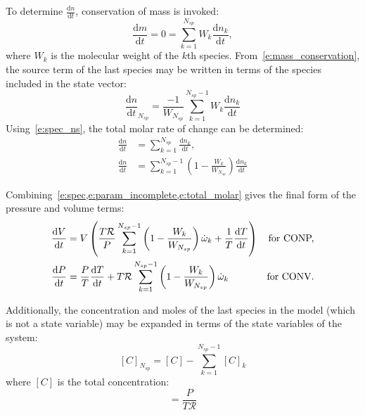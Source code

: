 \documentclass[12pt]{article}
\newcommand{\ns}{N_{sp}}
\newcommand{\conp}{CONP}
\newcommand{\conv}{CONV}
\newcommand{\dconp}{\ifmmode\text{for \conp,}\else for \conp,\fi}
\newcommand{\dconv}{\ifmmode\text{for \conv,}\else for \conv.\fi}
\newcommand{\Ru}{\mathcal{R}}
\begin{document}
To determine $\frac{\text{d} n }{\text{d} t }$, conservation of mass is invoked:
\begin{equation}
 \label{e:mass_conservation}
 \frac{\text{d} m }{\text{d} t } = 0 = \sum_{k=1}^{\ns}  W_{k} \frac{\text{d} n_{k} }{\text{d} t },
\end{equation}
where $W_{k}$ is the molecular weight of the $k$th species.
From~\cref{e:mass_conservation}, the source term of the last species may be written in terms of the species included in the state vector:
\begin{equation}
 \frac{\text{d} n }{\text{d} t }_{\ns} = \frac{-1}{W_{\ns}} \sum_{k=1}^{\ns - 1} W_{k} \frac{\text{d} n_{k} }{\text{d} t }
 \label{e:spec_ns}
\end{equation}
Using~\cref{e:spec_ns}, the total molar rate of change can be determined:
\begin{align}
\frac{\text{d} n }{\text{d} t } &= \sum_{k=1}^{\ns} \frac{\text{d} n_{k} }{\text{d} t }, \nonumber \\
\frac{\text{d} n }{\text{d} t } &= \sum_{k=1}^{\ns - 1} \left(1 - \frac{W_{k}}{W_{\ns}}\right) \frac{\text{d} n_{k} }{\text{d} t }
\label{e:total_molar}
\end{align}

Combining~\cref{e:spec,e:param_incomplete,e:total_molar} gives the final form of the pressure and volume terms:
\begin{subequations}
\label{e:param_complete}
\begin{align}
\frac{\text{d} V }{\text{d} t } &= V \left(\frac{T \Ru}{P} \sum_{k=1}^{\ns  - 1} \left(1 - \frac{W_{k}}{W_{\ns}}\right) \dot{\omega}_{k} + \frac{1}{T} \frac{\text{d} T }{\text{d} t }\right)& \text{\dconp} \\
\frac{\text{d} P }{\text{d} t } &= \frac{P}{T} \frac{\text{d} T }{\text{d} t } + T \Ru \sum_{k=1}^{\ns  - 1} \left(1 - \frac{W_{k}}{W_{\ns}}\right) \dot{\omega}_{k}&\text{\dconv}
\end{align}
\end{subequations}

Additionally, the concentration and moles of the last species in the model (which is not a state variable) may be expanded in terms of the state variables of the system:
\begin{equation}
 \label{e:last_spec_conc}
   [C]_{\ns} = [C] - \sum_{k=1}^{\ns  - 1} [C]_{k}
\end{equation}
where $[C]$ is the total concentration:
\begin{equation}
 [C] = \frac{P}{T \Ru}
\end{equation}
\end{document}
